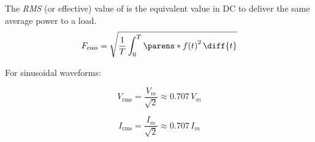 \begin{multicols}{2}
\begin{CheatsheetEntryFrame}
    \end{CheatsheetEntryFrame}

    \MulticolsBreak

    \begin{CheatsheetEntryFrame}


        The \textit{RMS} (or effective) value of  is the equivalent value in DC to deliver the same average power to a load.
        \begin{equation*}
            F_\text{rms} =\sqrt{\frac{1}{T} \int_0^T{\parens*{f(t)}^2 \,\diff{t}}} 
        \end{equation*}

        For sinusoidal waveforms:

        \begin{minipage}{0.5\columnwidth}%
            \begin{equation*}
                V_\text{rms} = \frac{V_m}{\sqrt{2}} \approx 0.707 \, V_m
            \end{equation*}
        \end{minipage}%
        \begin{minipage}{0.5\columnwidth}%
            \begin{equation*}
                I_\text{rms} = \frac{I_m}{\sqrt{2}} \approx 0.707 \, I_m
            \end{equation*}
        \end{minipage}%


        \CheatsheetEntryExtraSeparation

    \end{CheatsheetEntryFrame}

    \begin{CheatsheetEntryFrame}



\end{CheatsheetEntryFrame}
\end{multicols}
